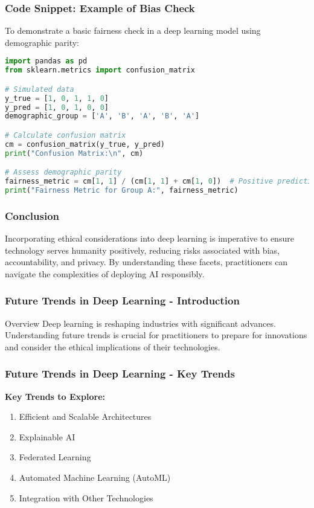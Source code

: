 \documentclass[aspectratio=169]{beamer}
\begin{document}
\begin{frame}[fragile]
    \frametitle{Code Snippet: Example of Bias Check}
    To demonstrate a basic fairness check in a deep learning model using demographic parity:

    \begin{lstlisting}[language=Python]
import pandas as pd
from sklearn.metrics import confusion_matrix

# Simulated data
y_true = [1, 0, 1, 1, 0]
y_pred = [1, 0, 1, 0, 0]
demographic_group = ['A', 'B', 'A', 'B', 'A']

# Calculate confusion matrix
cm = confusion_matrix(y_true, y_pred)
print("Confusion Matrix:\n", cm)

# Assess demographic parity
fairness_metric = cm[1, 1] / (cm[1, 1] + cm[1, 0])  # Positive predictive rate for group A
print("Fairness Metric for Group A:", fairness_metric)
    \end{lstlisting}
\end{frame}

\begin{frame}[fragile]
    \frametitle{Conclusion}
    Incorporating ethical considerations into deep learning is imperative to ensure technology serves humanity positively, reducing risks associated with bias, accountability, and privacy. By understanding these facets, practitioners can navigate the complexities of deploying AI responsibly.
\end{frame}

\begin{frame}[fragile]
    \frametitle{Future Trends in Deep Learning - Introduction}
    \begin{block}{Overview}
        Deep learning is reshaping industries with significant advances. 
        Understanding future trends is crucial for practitioners to prepare for innovations and consider the ethical implications of their technologies.
    \end{block}
\end{frame}

\begin{frame}[fragile]
    \frametitle{Future Trends in Deep Learning - Key Trends}
    \textbf{Key Trends to Explore:} 
    \begin{enumerate}
        \item Efficient and Scalable Architectures
        \item Explainable AI
        \item Federated Learning
        \item Automated Machine Learning (AutoML)
        \item Integration with Other Technologies
    \end{enumerate}
\end{frame}
\end{document}
